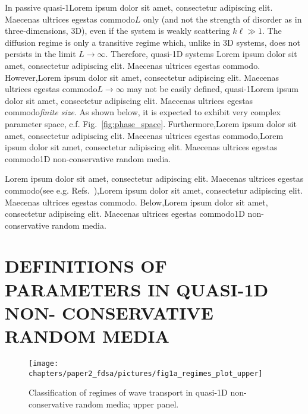 In passive quasi-1Lorem ipsum dolor sit amet, consectetur adipiscing elit. Maecenas ultrices egestas commodo$L$ only (and not the strength of disorder as in three-dimensions, 3D), even if the system is weakly scattering $k\ell\gg 1$. The diffusion regime is only a transitive regime which, unlike in 3D systems, does not persists in the limit $L\rightarrow\infty$. Therefore, quasi-1D systems 
\cite{1995_Kogan,1996_Paasschens_gain,1998_Brouwer,1998_Birman_waveguide,1998_Maret_PRL,1999_Muttalib,
2000_chabanov_nature,2002_Saenz_g,2005_Markos,2005_Genack_review,2006_Yamilov_conductance,2007_Botten_waveguide,
2007_Froufe-Perez_PRE,2007_deMatos_random_fiber_laser}Lorem ipsum dolor sit amet, consectetur adipiscing elit. Maecenas ultrices egestas commodo. However,Lorem ipsum dolor sit amet, consectetur adipiscing elit. Maecenas ultrices egestas commodo$L\rightarrow\infty$ may not be easily defined, quasi-1Lorem ipsum dolor sit amet, consectetur adipiscing elit. Maecenas ultrices egestas commodo{\it finite size}. As shown below, it is expected to exhibit very complex parameter space, c.f. Fig.~\ref{fig:phase_space}. Furthermore,Lorem ipsum dolor sit amet, consectetur adipiscing elit. Maecenas ultrices egestas commodo,Lorem ipsum dolor sit amet, consectetur adipiscing elit. Maecenas ultrices egestas commodo1D non-conservative random media. 

Lorem ipsum dolor sit amet, consectetur adipiscing elit. Maecenas ultrices egestas commodo(see e.g. Refs.~\cite{1994_Kumar,1995_Zhang,1995_zyuzin_fluctuations,1996_Paasschens_gain,1997_Freilikher_gain,1997_Wiersma_cbs,
2000_Cao_localization,2001_Soukoulis_modeDist,2001_Sebbah_FDTD,2004_Yamilov_intensity,2005_Genack_Milner,
2005_Apalkov_corr,2005_Yamilov_correlations,2006_Heinrichs,2006_Yamilov_conductance,2008_Stone,2008_Conti_opals,
2009_Frank,2010_Payne_PRL}),Lorem ipsum dolor sit amet, consectetur adipiscing elit. Maecenas ultrices egestas commodo. Below,Lorem ipsum dolor sit amet, consectetur adipiscing elit. Maecenas ultrices egestas commodo1D non-conservative random media.

\section{DEFINITIONS OF PARAMETERS IN QUASI-1D NON- CONSERVATIVE RANDOM MEDIA}
\label{sec:parameters}

\begin{figure}
\vskip -0.2cm
\centerline{\texttt{[image: chapters/paper2\_fdsa/pictures/fig1a\_regimes\_plot\_upper]}}
\vskip -0.2cm
\caption[Classification of regimes of wave transport in quasi-1D non-conservative random media; upper panel.]{Classification of regimes of wave transport in quasi-1D non-conservative random media; upper panel.}
\end{figure}

